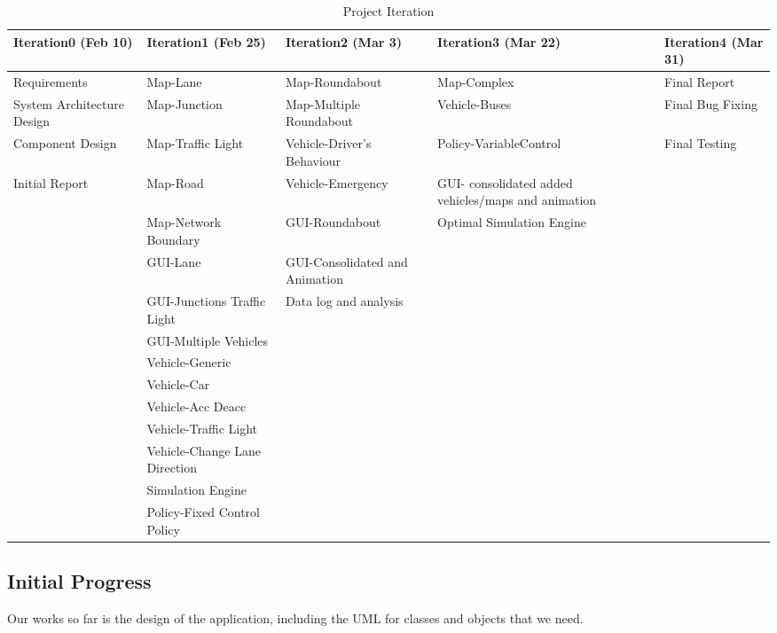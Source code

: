 \documentclass[11pt]{article}
\begin{document}
\begin{table}[p]
		\caption{Project Iteration}
		\centering
		\begin{tabular}{p{2.5cm}|p{3.5cm}|p{2.5cm}|p{2.5cm}|p{2cm}}
		\hline\hline
		Iteration0 (Feb 10) & Iteration1 (Feb 25) & Iteration2 (Mar 3) & Iteration3 (Mar 22) & Iteration4 (Mar 31)\\ [0.5ex]
		\hline
		
		Requirements & Map-Lane & Map-Roundabout & Map-Complex & Final Report\\[1ex]
		
		System Architecture Design & Map-Junction & Map-Multiple Roundabout & Vehicle-Buses & Final Bug Fixing\\ [1ex]
		
		Component Design & Map-Traffic Light & Vehicle-Driver's Behaviour & Policy-VariableControl & Final Testing\\ [1ex]
		
		Initial Report & Map-Road & Vehicle-Emergency & GUI- consolidated added vehicles/maps and animation \\[1ex]
		
		& Map-Network Boundary & GUI-Roundabout & Optimal Simulation Engine \\[1ex] 
		
		& GUI-Lane & GUI-Consolidated and Animation & \\[1ex]
		
		& GUI-Junctions Traffic Light & Data log and analysis & &\\[1ex]
		& GUI-Multiple Vehicles &&&\\[1ex]
		& Vehicle-Generic &&& \\[1ex]
		& Vehicle-Car &&& \\[1ex]
		& Vehicle-Acc Deacc &&& \\[1ex]
		& Vehicle-Traffic Light &&& \\[1ex]
		& Vehicle-Change Lane Direction &&& \\[1ex]
		& Simulation Engine &&& \\[1ex]
		& Policy-Fixed Control Policy &&&\\
		
		\hline
		\end{tabular}
		\label{table:iteration} 
		\end{table}

	
\subsection{Initial Progress}
Our works so far is the design of the application, including the UML for classes and objects that we need. 
\end{document}
